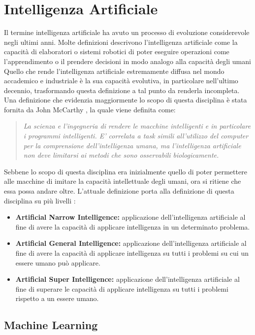 \section{Intelligenza Artificiale}
Il termine intelligenza artificiale ha avuto un processo di evoluzione considerevole negli ultimi anni.
Molte definizioni descrivono l'intelligenza artificiale come la capacità di elaboratori o sistemi robotici di poter eseguire operazioni come l'apprendimento o il prendere decisioni in modo analogo alla capacità degli umani \cite{MWDict,CollinsDict}
Quello che rende l'intelligenza artificiale estremamente diffusa nel mondo accademico e industriale è la sua capacità evolutiva, in particolare nell'ultimo decennio, trasformando questa definizione a tal punto da renderla incompleta.
Una definizione che evidenzia maggiormente lo scopo di questa disciplina è stata fornita da John McCarthy \cite{mccarthy2004}, la quale viene definita come:
\begin{quote}
\textit{    La scienza e l'ingegneria di rendere le macchine intelligenti e in particolare i programmi intelligenti. E' correlata a task simili all'utilizzo del computer per la comprensione dell'intelligenza umana, ma l'intelligenza artificiale non deve limitarsi ai metodi che sono osservabili biologicamente.}
    \end{quote}
Sebbene lo scopo di questa disciplina era inizialmente quello di poter permettere alle macchine di imitare la capacità intellettuale degli umani, ora si ritiene che essa possa andare oltre.
L'attuale definizione porta alla definizione di questa disciplina su più livelli \cite{wiki:Artificial_intelligence}:
\begin{itemize}
    \item \textbf{Artificial Narrow Intelligence:} applicazione dell'intelligenza artificiale al fine di avere la capacità di applicare intelligenza in un determinato problema.
    \item \textbf{Artificial General Intelligence:} applicazione dell'intelligenza artificiale al fine di avere la capacità di applicare intelligenza su tutti i problemi su cui un essere umano può applicare.
    \item \textbf{Artificial Super Intelligence: } applicazione dell'intelligenza artificiale al fine di superare le capacità di applicare intelligenza su tutti i problemi rispetto a un essere umano.
\end{itemize}

\subsection{Machine Learning}


